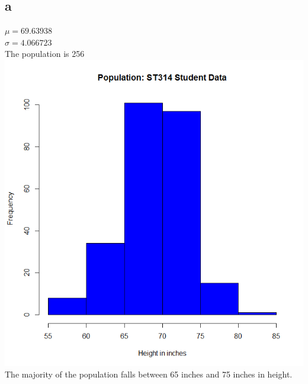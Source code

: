 \documentclass[10pt,letterpaper]{article}
\begin{document}
\subsection*{a}
$\mu = 69.63938$\\
$\sigma = 4.066723$\\
The population is 256\\
\includegraphics[scale=.5]{student-hist}\\
The majority of the population falls between 65 inches and 75 inches in height.
\end{document}

